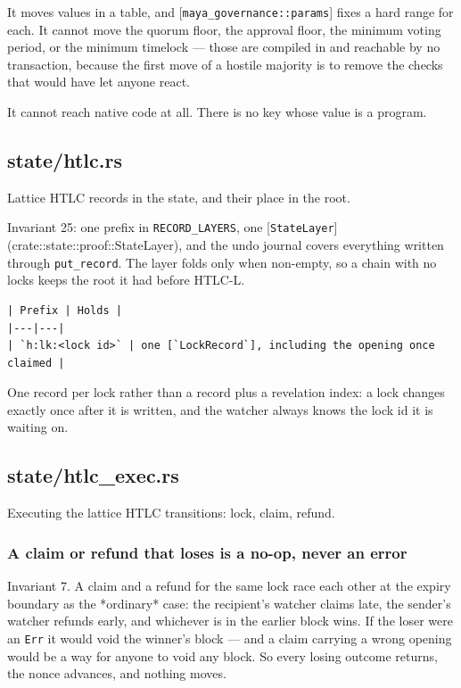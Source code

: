 \documentclass[11pt,a4paper]{article}
\begin{document}
It moves values in a table, and [\texttt{maya\_governance::params}] fixes a hard
range for each. It cannot move the quorum floor, the approval floor, the
minimum voting period, or the minimum timelock — those are compiled in and
reachable by no transaction, because the first move of a hostile majority is
to remove the checks that would have let anyone react.

It cannot reach native code at all. There is no key whose value is a
program.

\subsection{state/htlc.rs}
Lattice HTLC records in the state, and their place in the root.

Invariant 25: one prefix in \texttt{RECORD\_LAYERS}, one
[\texttt{StateLayer}](crate::state::proof::StateLayer), and the undo journal covers
everything written through \texttt{put\_record}. The layer folds only when
non-empty, so a chain with no locks keeps the root it had before HTLC-L.

\begin{verbatim}
| Prefix | Holds |
|---|---|
| `h:lk:<lock id>` | one [`LockRecord`], including the opening once claimed |
\end{verbatim}

One record per lock rather than a record plus a revelation index: a lock
changes exactly once after it is written, and the watcher always knows the
lock id it is waiting on.

\subsection{state/htlc\_exec.rs}
Executing the lattice HTLC transitions: lock, claim, refund.

\subsubsection{A claim or refund that loses is a no-op, never an error}

Invariant 7. A claim and a refund for the same lock race each other at the
expiry boundary as the *ordinary* case: the recipient's watcher claims late,
the sender's watcher refunds early, and whichever is in the earlier block
wins. If the loser were an \texttt{Err} it would void the winner's block — and a
claim carrying a wrong opening would be a way for anyone to void any block.
So every losing outcome returns, the nonce advances, and nothing moves.
\end{document}

